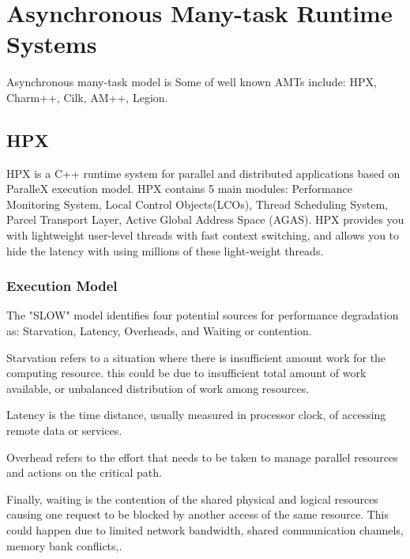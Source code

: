 \section{Asynchronous Many-task Runtime Systems}
Asynchronous many-task model is 
Some of well known AMTs include: HPX\cite{kaiser2014hpx}, Charm++\cite{kale1993charm++}, Cilk\cite{blumofe1996cilk}, AM++\cite{willcock2010am++}, Legion\cite{bauer2012legion}.


\vspace{\baselineskip}
\subsection{HPX}
HPX\cite{kaiser2014hpx} is a C++ runtime system for parallel and distributed applications based on ParalleX execution model\cite{kaiser2009parallex}. 
HPX contains 5 main modules: Performance Monitoring System, Local Control Objects(LCOs), Thread Scheduling System, Parcel Transport Layer, Active Global Address Space (AGAS).
HPX provides you with lightweight user-level threads with fast context switching, and allows you to hide the latency with using millions of these light-weight threads\cite{kulkarni2019comparative}.  

\vspace{\baselineskip}
\subsubsection{Execution Model}
The "SLOW" model identifies four potential sources for performance degradation as: Starvation, Latency, Overheads, and Waiting or contention\cite{kaiser2009parallex}.

Starvation refers to a situation where there is insufficient amount work for the computing resource. this could be due to insufficient total amount of work available, or unbalanced distribution of work among resources\cite{kulkarni2019comparative}. 

Latency is the time distance, usually measured in processor clock, of accessing remote data or services\cite{gao2007parallex}.  

Overhead refers to the effort that needs to be taken to manage parallel resources and actions on the critical path\cite{kulkarni2019comparative}.

Finally, waiting is the contention of the shared physical and logical resources causing one request to be blocked by another access of the same resource\cite{gao2007parallex}. This could happen due to limited network bandwidth, shared communication channels, memory bank conflicts\cite{kulkarni2019comparative},\cite{gao2007parallex}. 


